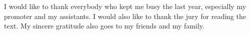\documentclass[master=wit,english]{kulemt}
\begin{document}
\begin{preface}
  I would like to thank everybody who kept me busy the last year,
  especially my promoter and my assistants. I would also like to thank the
  jury for reading the text. My sincere gratitude also goes to my friends and my family.
\end{preface}

\tableofcontents*

\begin{abstract}
\end{abstract}


\mainmatter







\appendixpage*          %
\appendix



\backmatter


\end{document}
